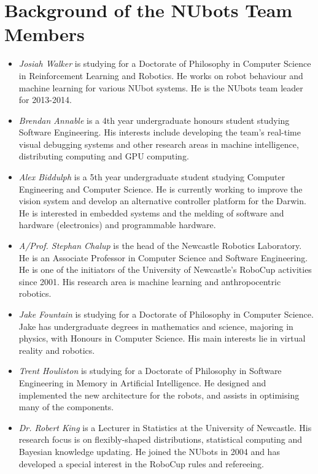 \documentclass{llncs}
\begin{document}
\section{Background of the NUbots Team Members}
\begin{itemize}
\item \emph{Josiah Walker} is studying for a Doctorate of Philosophy in Computer Science in Reinforcement Learning and Robotics. He works on robot behaviour and machine learning for various NUbot systems. He is the NUbots team leader for 2013-2014.

\item \emph{Brendan Annable} is a 4th year undergraduate honours student studying Software Engineering. His interests include developing the team's real-time visual debugging systems and other research areas in machine intelligence, distributing computing and GPU computing.

\item \emph{Alex Biddulph} is a 5th year undergraduate student studying Computer Engineering and Computer Science. He is currently working to improve the vision system and develop an alternative controller platform for the Darwin.
He is interested in embedded systems and the melding of software and hardware (electronics) and programmable hardware.

\item \emph{A/Prof. Stephan Chalup} is the head of the Newcastle Robotics
Laboratory. He is an Associate Professor in Computer Science and Software Engineering.
He is one of the initiators of the University of Newcastle's
RoboCup activities since 2001. His research area is machine learning
and anthropocentric robotics.

\item \emph{Jake Fountain} is studying for a Doctorate of Philosophy in Computer Science. 
Jake has undergraduate degrees in mathematics and science, majoring in physics, with Honours in Computer Science. 
His main interests lie in virtual reality and robotics.

\item \emph{Trent Houliston} is studying for a Doctorate of Philosophy in Software Engineering in Memory in Artificial Intelligence. He designed and implemented the new architecture for the robots, and assists in optimising many of the components.

\item \emph{Dr. Robert King} is a Lecturer in Statistics at the University of Newcastle. His research focus is on flexibly-shaped distributions,
statistical computing and Bayesian knowledge updating. He joined the
NUbots in 2004 and has developed a special interest in the RoboCup rules and refereeing.


\end{itemize}
\end{document}
